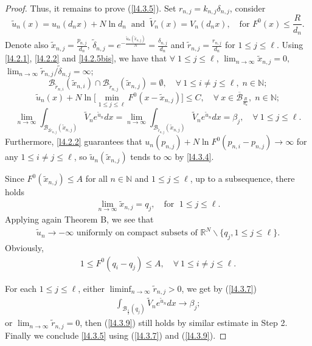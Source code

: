 \documentclass[11pt]{amsart}
\numberwithin{equation}{section}
\newcommand{\N}{\mathbb{N}}
\begin{document}
\begin{proof}
Thus, it remains to prove (\ref{l4.3.5}). Set $r_{n,j}=k_{n, j}\delta_{n, j}$, consider
$$\widetilde{u}_{n}(x)=u_{n}(d_{n}x)+N\ln d_{n} \;\; \mbox{and} \;\; \widetilde{V}_{n}(x)=V_{n}(d_{n}x), \quad \mbox{for } F^{0}(x)\leq\frac{R}{d_{n}}.$$
Denote also $\widetilde{x}_{n, j}=\frac{p_{n, j}}{d_{n}}$, $\widetilde{\delta}_{n, j}=e^{-\frac{\widetilde{u}_{n}(\widetilde{x}_{n, j})}{N}}=\frac{\delta_{n, j}}{d_{n}}$ and $\widetilde{r}_{n, j}=\frac{r_{n, j}}{d_{n}}$ for $1\leq j\leq \ell$. Using \eqref{l4.2.1}, \eqref{l4.2.2} and \eqref{l4.2.5bis}, we have that $\forall\; 1\le j \le \ell$, $\lim_{n\to\infty} \widetilde{x}_{n,j}=0,$
$\lim_{n\to\infty} \widetilde{r}_{n, j}/\widetilde{\delta}_{n, j} =\infty$;
$$\mathcal{B}_{\widetilde{r}_{n,i}}(\widetilde{x}_{n,i})\cap \mathcal{B}_{\widetilde{r}_{n, j}}(\widetilde{x}_{n, j})=\emptyset,\quad\forall~ 1\leq i\ne j\leq \ell, \; n \in \N;$$
$$\widetilde{u}_{n}(x)+N\ln\Big[\min_{1\leq j\leq \ell}F^{0}(x-\widetilde{x}_{n, j})\Big] \leq C,\quad\forall ~ x\in\overline{\mathcal{B}}_\frac{R}{d_{n}}, \; n\in \N;$$
$$\lim\limits_{n\rightarrow\infty}\int_{\mathcal{B}_{2\widetilde{r}_{n, j}}(\widetilde{x}_{n, j})}\widetilde{V}_{n}e^{\widetilde{u}_{n}}dx=\lim\limits_{n\rightarrow\infty}
\int_{\mathcal{B}_{\widetilde{r}_{n, j}}(\widetilde{x}_{n, j})}\widetilde{V}_{n}e^{\widetilde{u}_{n}}dx=\beta_j, \quad\forall~ 1\leq j\leq \ell.$$
Furthermore, \eqref{l4.2.2} guarantees that $u_n(p_{n, j}) + N\ln F^0(p_{n,i}-p_{n,j}) \to \infty$ for any $1\leq i\ne j\leq \ell$, so $\widetilde u_n(\widetilde x_{n, j})$ tends to $\infty$ by \eqref{l4.3.4}.

Since $F^{0}(\widetilde{x}_{n, j})\leq A$ for all $n \in \N$ and $1\leq j\leq \ell$, up to a subsequence, there holds
\begin{align*}
\lim_{n\to\infty} \widetilde{x}_{n, j} = q_j, \quad\mbox{for }\; 1\leq j\leq \ell.
\end{align*}
Applying again Theorem B, we see that
\begin{align}\label{l4.3.7}
\widetilde{u}_{n}\rightarrow-\infty \mbox{ uniformly on compact subsets of } \mathbb{R}^{N}\backslash \{q_j, 1 \le j \le \ell\}.
\end{align}
Obviously,
\begin{align*}
1\leq F^{0}(q_i - q_j)\leq A, \quad\forall~ 1\leq i\ne j\leq \ell.
\end{align*}

For each $ 1\leq j\leq \ell$, either $\liminf_{n\rightarrow\infty}\widetilde{r}_{n,j}>0$, we get by (\ref{l4.3.7})
\begin{align}\label{l4.3.9}
\int_{\mathcal{B}_{\frac{1}{2}}(q_j)}\widetilde{V}_{n}e^{\widetilde{u}_{n}}dx\rightarrow \beta_j;
\end{align}
or $\lim_{n\rightarrow\infty}\widetilde{r}_{n, j}=0$, then (\ref{l4.3.9}) still holds by similar estimate in Step 2. Finally we conclude \eqref{l4.3.5} using (\ref{l4.3.7}) and (\ref{l4.3.9}).


\end{proof}
\end{document}

